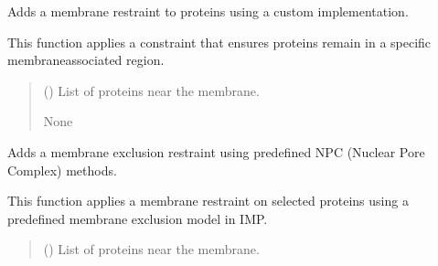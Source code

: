 \documentclass[letterpaper,10pt,english]{sphinxmanual}
\begin{document}
\begin{fulllineitems}

\begin{fulllineitems}
\label{\detokenize{src:src.System_Class.System.add_membrane_restraint}}
\pysigstartsignatures
{}
\pysigstopsignatures
\sphinxAtStartPar
Adds a membrane restraint to proteins using a custom implementation.

\sphinxAtStartPar
This function applies a constraint that ensures proteins remain in a
specific membrane\sphinxhyphen{}associated region.
\begin{quote}\begin{description}
\sphinxAtStartPar
{} () \textendash{} List of proteins near the membrane.

\sphinxAtStartPar
None

\end{description}\end{quote}

\end{fulllineitems}


\begin{fulllineitems}
\label{\detokenize{src:src.System_Class.System.add_membrane_restraint2}}
\pysigstartsignatures
{}
\pysigstopsignatures
\sphinxAtStartPar
Adds a membrane exclusion restraint using predefined NPC (Nuclear Pore Complex) methods.

\sphinxAtStartPar
This function applies a membrane restraint on selected proteins using a predefined
membrane exclusion model in IMP.
\begin{quote}\begin{description}
\sphinxAtStartPar
{} () \textendash{} List of proteins near the membrane.


\end{description}
\end{quote}
\end{fulllineitems}
\end{fulllineitems}
\end{document}
